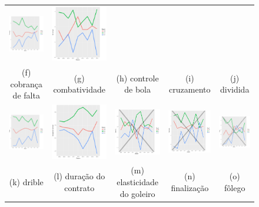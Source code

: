 \documentclass[review]{elsarticle}
\begin{document}
\begin{figure}[!bp]
\begin{tabular}{ccccc}
  \includegraphics[width=25mm]{cruzamento_result} & \includegraphics[width=25mm]{div_empe_result} \\
 \scriptsize{(f) cobrança de falta } & \scriptsize{(g) combatividade } & \scriptsize{(h) controle de bola} & \scriptsize{(i) cruzamento} & \scriptsize{(j) dividida}\\[3pt]
 
 \includegraphics[width=25mm]{dribles_result} & \includegraphics[width=25mm]{duracaodocontrato_result} &   \includegraphics[width=25mm]{elast_gl_result} &
  \includegraphics[width=25mm]{finalizacao_result} & \includegraphics[width=25mm]{folego_result}  \\
 \scriptsize{(k) drible} & \scriptsize{(l) duração do contrato } & \scriptsize{(m) elasticidade do goleiro} & \scriptsize{(n) finalização} & \scriptsize{(o) fôlego}\\[3pt]
 

\end{tabular}
\end{figure}
\end{document}
